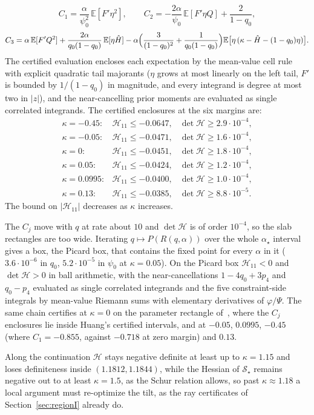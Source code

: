 \documentclass[11pt]{article}
\theoremstyle{remark}
\newcommand{\E}{\mathbb{E}}
\newcommand{\sS}{\mathcal{S}}
\begin{document}
\[
C_1=\frac{\alpha}{\psi_0^2}\,\E[F'\eta^2],\qquad
C_2=-\frac{2\alpha}{\psi_0}\,\E[F'\eta Q]+\frac{2}{1-q_0},
\]
\[
C_3=\alpha\,\E[F'Q^2]+\frac{2\alpha}{q_0(1-q_0)}\,\E[\eta \hat H]
-\alpha\Bigl(\frac{3}{(1-q_0)^2}+\frac{1}{q_0(1-q_0)}\Bigr)
\E\bigl[\eta \,(\kappa-\hat H-(1-q_0)\eta)\bigr].
\]
The certified evaluation encloses each expectation by the mean-value
cell rule with explicit quadratic tail majorants ($\eta$ grows at most
linearly on the left tail, $F'$ is bounded by $1/(1-q_0)$ in
magnitude, and every integrand is degree at most two in $|z|$), and
the near-cancelling prior moments are evaluated as single correlated
integrands.  The certified enclosures at the six margins are:
\[
\begin{array}{lll}
\kappa=-0.45: & \mathcal H_{11}\le-0.0647, & \det \mathcal H\ge 2.9\cdot10^{-4},\\
\kappa=-0.05: & \mathcal H_{11}\le-0.0471, & \det \mathcal H\ge 1.6\cdot10^{-4},\\
\kappa=0:     & \mathcal H_{11}\le-0.0451, & \det \mathcal H\ge 1.8\cdot10^{-4},\\
\kappa=0.05:  & \mathcal H_{11}\le-0.0424, & \det \mathcal H\ge 1.2\cdot10^{-4},\\
\kappa=0.0995:& \mathcal H_{11}\le-0.0400, & \det \mathcal H\ge 1.0\cdot10^{-4},\\
\kappa=0.13:  & \mathcal H_{11}\le-0.0385, & \det \mathcal H\ge 8.8\cdot10^{-5}.
\end{array}
\]
The bound on $|\mathcal H_{11}|$ decreases as $\kappa$ increases.

The $C_j$ move with $q$ at rate about $10$ and $\det\mathcal H$ is of
order $10^{-4}$, so the slab rectangles are too wide.  Iterating
$q\mapsto P(R(q,\alpha))$ over the whole $\alpha_\star$ interval gives a box,
the Picard box, that contains the fixed point for every $\alpha$ in it
($3.6\cdot10^{-6}$ in $q_0$, $5.2\cdot10^{-5}$ in $\psi_0$ at
$\kappa=0.05$).  On the Picard box
$\mathcal H_{11}<0$ and $\det \mathcal H>0$ in ball arithmetic, with the
near-cancellations $1-4q_0+3p_4$ and $q_0-p_4$ evaluated as single
correlated integrands and the five constraint-side integrals by
mean-value Riemann sums with elementary derivatives of $\varphi/\Psi$.
The same chain certifies at $\kappa=0$ on the parameter rectangle
of~\cite[Section~7]{ding2019capacity},
where the $C_j$ enclosures lie inside Huang's certified
intervals, and at $-0.05$, $0.0995$, $-0.45$ (where $C_1=-0.855$,
against $-0.718$ at zero margin) and $0.13$.

Along the continuation $\mathcal H$ stays negative definite at least
up to $\kappa=1.15$ and loses definiteness inside $(1.1812,1.1844)$,
while the Hessian of $\sS_\star$ remains negative
out to at least $\kappa=1.5$, as the Schur relation allows, so past
$\kappa\approx1.18$ a local argument must re-optimize the tilt, as
the ray certificates of Section~\ref{sec:regionI} already do.
\end{document}
